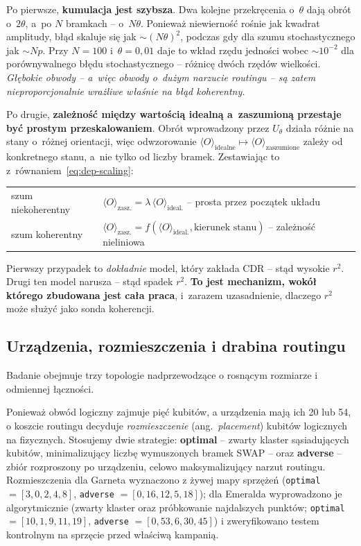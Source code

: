 \documentclass[11pt]{article}
\newcommand{\expv}{\langle O\rangle}
\begin{document}
Po pierwsze, \textbf{kumulacja jest szybsza}. Dwa kolejne przekręcenia o~$\theta$ dają obrót o~$2\theta$,
a~po $N$ bramkach -- o~$N\theta$. Ponieważ niewierność rośnie jak kwadrat amplitudy, błąd skaluje
się jak $\sim (N\theta)^2$, podczas gdy dla szumu stochastycznego jak $\sim Np$. Przy
$N=100$ i~$\theta = 0{,}01$ daje to wkład rzędu jedności wobec $\sim 10^{-2}$ dla porównywalnego
błędu stochastycznego -- różnicę dwóch rzędów wielkości. \emph{Głębokie obwody -- a~więc obwody
o~dużym narzucie routingu -- są zatem nieproporcjonalnie wrażliwe właśnie na błąd koherentny.}

Po drugie, \textbf{zależność między wartością idealną a~zaszumioną przestaje
być prostym przeskalowaniem}. Obrót wprowadzony przez $U_\theta$ działa różnie na stany o~różnej
orientacji, więc odwzorowanie $\expv_{\text{idealne}} \mapsto \expv_{\text{zaszumione}}$ zależy od
konkretnego stanu, a~nie tylko od liczby bramek. Zestawiając to z~równaniem~\eqref{eq:dep-scaling}:
\begin{center}
\begin{tabular}{ll}
\toprule
szum niekoherentny & $\expv_{\text{zasz.}} = \lambda\,\expv_{\text{ideal.}}$ \quad -- prosta przez początek układu \\
szum koherentny & $\expv_{\text{zasz.}} = f(\expv_{\text{ideal.}}, \text{kierunek stanu})$ \quad -- zależność nieliniowa \\
\bottomrule
\end{tabular}
\end{center}
Pierwszy przypadek to \emph{dokładnie} model, który zakłada CDR -- stąd wysokie $r^2$. Drugi ten
model narusza -- stąd spadek $r^2$. \textbf{To jest mechanizm, wokół którego zbudowana jest cała
praca}, i~zarazem uzasadnienie, dlaczego $r^2$ może służyć jako sonda koherencji.

\subsection{Urządzenia, rozmieszczenia i drabina routingu}\label{sec:urzadzenia}

Badanie obejmuje trzy topologie nadprzewodzące o rosnącym rozmiarze i odmiennej łączności.

Ponieważ obwód logiczny zajmuje pięć kubitów, a urządzenia mają ich 20 lub 54, o koszcie routingu
decyduje \emph{rozmieszczenie} (ang.\ \emph{placement}) kubitów logicznych na fizycznych. Stosujemy
dwie strategie: \textbf{optimal} -- zwarty klaster sąsiadujących kubitów, minimalizujący liczbę
wymuszonych bramek SWAP -- oraz \textbf{adverse} -- zbiór rozproszony po urządzeniu, celowo
maksymalizujący narzut routingu. Rozmieszczenia dla Garneta wyznaczono z żywej mapy sprzężeń
(\texttt{optimal} $=[3,0,2,4,8]$, \texttt{adverse} $=[0,16,12,5,18]$); dla Emeralda wyprowadzono je
algorytmicznie (zwarty klaster oraz próbkowanie najdalszych punktów; \texttt{optimal}
$=[10,1,9,11,19]$, \texttt{adverse} $=[0,53,6,30,45]$) i zweryfikowano testem kontrolnym na sprzęcie
przed właściwą kampanią.
\end{document}
